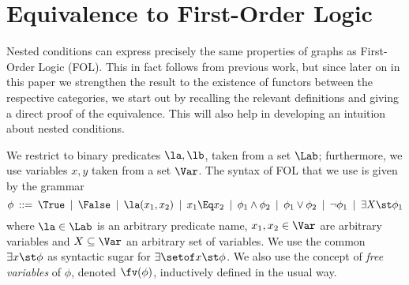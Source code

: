 \section{Equivalence to First-Order Logic}

Nested conditions can express precisely the same properties of graphs as First-Order Logic (FOL). This in fact follows from previous work, but since later on in this paper we strengthen the result to the existence of functors between the respective categories, we start out by recalling the relevant definitions and giving a direct proof of the equivalence. This will also help in developing an intuition about nested conditions.

We restrict to binary predicates $\la,\lb$, taken from a set $\Lab$; furthermore, we use variables $x,y$ taken from a set $\Var$. The syntax of FOL that we use is given by the grammar
%
\[ \phi \:::=\: \True
        \:\mid\: \False
		\:\mid\: \la(x_1,x_2)
        \:\mid\: x_1\Eq x_2
		\:\mid\: \phi_1\wedge \phi_2
		\:\mid\: \phi_1\vee \phi_2
		\:\mid\: \neg\phi_1
		\:\mid\: \exists X\st \phi_1 
		\]
where $\la\in\Lab$ is an arbitrary predicate name, $x_1,x_2\in\Var$ are arbitrary variables and $X\subseteq \Var$ an arbitrary set of variables. We use the common $\exists x\st \phi$ as syntactic sugar for $\exists\setof x\st \phi$. We also use the concept of \emph{free variables} of $\phi$, denoted $\fv(\phi)$, inductively defined in the usual way. 

